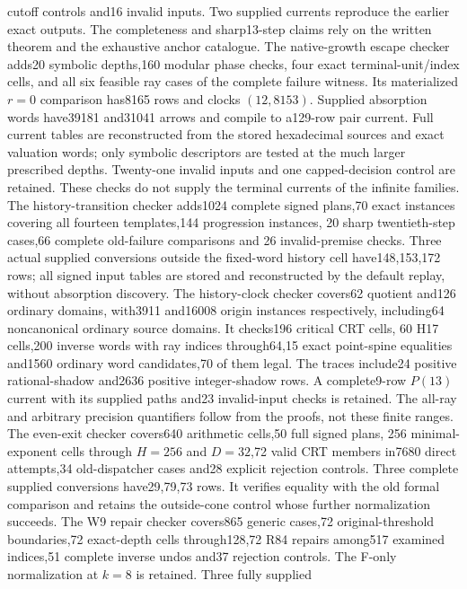 \documentclass[11pt]{article}
\begin{document}
cutoff controls and16 invalid inputs. Two supplied currents reproduce
the earlier exact outputs. The completeness and sharp13-step claims
rely on the written theorem and the exhaustive anchor catalogue.
The native-growth escape checker adds20 symbolic depths,160 modular
phase checks, four exact terminal-unit/index cells, and all six feasible
ray cases of the complete failure witness. Its materialized $r=0$
comparison has8165 rows and clocks $(12,8153)$.
Supplied absorption words have39181 and31041 arrows and compile to
a129-row pair current. Full current tables are reconstructed from the
stored hexadecimal sources and exact valuation words; only symbolic
descriptors are tested at the much larger prescribed depths.
Twenty-one invalid inputs and one capped-decision control are retained.
These checks do not supply the terminal currents of the infinite families.
The history-transition checker adds1024 complete signed plans,70 exact
instances covering all fourteen templates,144 progression instances,
20 sharp twentieth-step cases,66 complete old-failure comparisons and
26 invalid-premise checks. Three actual supplied conversions outside
the fixed-word history cell have148,153,172 rows; all signed input tables
are stored and reconstructed by the default replay, without absorption
discovery.
The history-clock checker covers62 quotient and126 ordinary domains,
with3911 and16008 origin instances respectively, including64
noncanonical ordinary source domains. It checks196 critical CRT cells,
60 H17 cells,200 inverse words with ray indices through64,15 exact
point-spine equalities and1560 ordinary word candidates,70 of them legal.
The traces include24 positive rational-shadow and2636 positive
integer-shadow rows. A complete9-row $P(13)$ current with its supplied
paths and23 invalid-input checks is retained. The all-ray and arbitrary
precision quantifiers follow from the proofs, not these finite ranges.
The even-exit checker covers640 arithmetic cells,50 full signed plans,
256 minimal-exponent cells through $H=256$ and $D=32$,72 valid CRT
members in7680 direct attempts,34 old-dispatcher cases and28 explicit
rejection controls. Three complete supplied conversions have29,79,73 rows.
It verifies equality with the old formal comparison and retains the
outside-cone control whose further normalization succeeds.
The W9 repair checker covers865 generic cases,72 original-threshold
boundaries,72 exact-depth cells through128,72 R84 repairs among517
examined indices,51 complete inverse undos and37 rejection controls.
The F-only normalization at $k=8$ is retained. Three fully supplied
\end{document}
